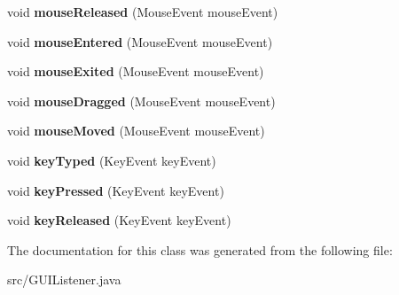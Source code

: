 \begin{DoxyCompactItemize}
\item 
void {\bfseries mouse\+Released} (Mouse\+Event mouse\+Event)\hypertarget{classGUIListener_ad9d4c366f5e965a2859d34008021296e}{}\label{classGUIListener_ad9d4c366f5e965a2859d34008021296e}

\item 
void {\bfseries mouse\+Entered} (Mouse\+Event mouse\+Event)\hypertarget{classGUIListener_a3a714ed0ff377a41d830a884adfe20e5}{}\label{classGUIListener_a3a714ed0ff377a41d830a884adfe20e5}

\item 
void {\bfseries mouse\+Exited} (Mouse\+Event mouse\+Event)\hypertarget{classGUIListener_aa4038ada664a15857dc2dea6ef19361c}{}\label{classGUIListener_aa4038ada664a15857dc2dea6ef19361c}

\item 
void {\bfseries mouse\+Dragged} (Mouse\+Event mouse\+Event)\hypertarget{classGUIListener_a03270bb04cc49e7cc40a07cec897a03d}{}\label{classGUIListener_a03270bb04cc49e7cc40a07cec897a03d}

\item 
void {\bfseries mouse\+Moved} (Mouse\+Event mouse\+Event)\hypertarget{classGUIListener_acfd39f94b381ec2fd3653bb18137a3a0}{}\label{classGUIListener_acfd39f94b381ec2fd3653bb18137a3a0}

\item 
void {\bfseries key\+Typed} (Key\+Event key\+Event)\hypertarget{classGUIListener_a7aacf142d63f4ef87009903be279ad70}{}\label{classGUIListener_a7aacf142d63f4ef87009903be279ad70}

\item 
void {\bfseries key\+Pressed} (Key\+Event key\+Event)\hypertarget{classGUIListener_a469eaac915f1d10930dcdde8feec3fb5}{}\label{classGUIListener_a469eaac915f1d10930dcdde8feec3fb5}

\item 
void {\bfseries key\+Released} (Key\+Event key\+Event)\hypertarget{classGUIListener_a0384d5954bf3864eeafd989d34f102ad}{}\label{classGUIListener_a0384d5954bf3864eeafd989d34f102ad}

\end{DoxyCompactItemize}


The documentation for this class was generated from the following file\+:\begin{DoxyCompactItemize}
\item 
src/G\+U\+I\+Listener.\+java\end{DoxyCompactItemize}
